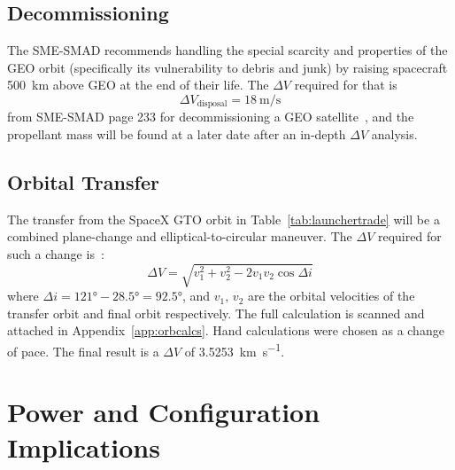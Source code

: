 \documentclass[9pt]{article}
\begin{document}
\subsection{Decommissioning}

The SME-SMAD recommends handling the special scarcity and properties of the GEO orbit (specifically its vulnerability to debris and junk) by raising spacecraft \qty{500}{\kilo\metre} above GEO at the end of their life.
The $\Delta V$ required for that is
\begin{equation}
  {\Delta V}_\text{disposal} = \qty{18}{\metre\per\second}
\end{equation}
from SME-SMAD page 233 for decommissioning a GEO satellite~\cite{sme}, and the propellant mass will be found at a later date after an in-depth $\Delta V$ analysis.

\subsection{Orbital Transfer}
The transfer from the SpaceX GTO orbit in Table~\ref{tab:launchertrade} will be a combined plane-change and elliptical-to-circular maneuver.
The $\Delta V$ required for such a change is~\cite{aero3240}:
\begin{equation}
  \Delta V=\sqrt{v_1^2+v_2^2-2v_1v_2\cos{\Delta i}}
\end{equation}
where $\Delta i=\ang{121}-\ang{28.5}=\ang{92.5}$, and $v_1,\,v_2$ are the orbital velocities of the transfer orbit and final orbit respectively.
The full calculation is scanned and attached in Appendix~\ref{app:orbcalcs}.
Hand calculations were chosen as a change of pace.
The final result is a $\Delta V$ of \qty{3.5253}{\kilo\meter\per\second}.


\section{Power and Configuration Implications}\label{app:powerandconf}
\end{document}

